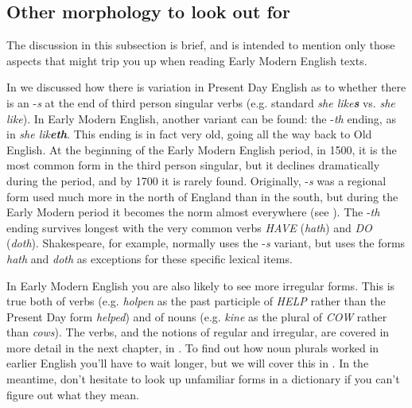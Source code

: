 \subsection{Other morphology to look out for}\label{sec:EModE-othermorph}

The discussion in this subsection is brief, and is intended to mention only those aspects that might trip you up when reading Early Modern English texts.

In  we discussed how there is variation in Present Day English as to whether there is an -\textit{s} at the end of third person singular verbs (e.g. standard \emph{she like\textbf{s}} vs. \emph{she like}). In Early Modern English, another variant can be found: the -\textit{th} ending, as in \textit{she lik\textbf{eth}}. This ending is in fact very old, going all the way back to Old English. At the beginning of the Early Modern English period, in 1500, it is the most common form in the third person singular, but it declines dramatically during the period, and by 1700 it is rarely found. Originally, -\textit{s} was a regional form used much more in the north of England than in the south, but during the Early Modern period it becomes the norm almost everywhere (see \citealp[67--68, 177--179]{NevalainenRaumolinBrunberg2016}). The -\textit{th} ending survives longest with the very common verbs \textit{HAVE} (\textit{hath}) and \textit{DO} (\textit{doth}). Shakespeare, for example, normally uses the -\textit{s} variant, but uses the forms \textit{hath} and \textit{doth} as exceptions for these specific lexical items.

In Early Modern English you are also likely to see more irregular forms. This is true both of verbs (e.g. \textit{holpen} as the past participle of \textit{HELP} rather than the Present Day form \textit{helped}) and of nouns (e.g. \textit{kine} as the plural of \textit{COW} rather than \textit{cows}). The verbs, and the notions of regular and irregular, are covered in more detail in the next chapter, in . To find out how noun plurals worked in earlier English you'll have to wait longer, but we will cover this in . In the meantime, don't hesitate to look up unfamiliar forms in a dictionary if you can't figure out what they mean.


